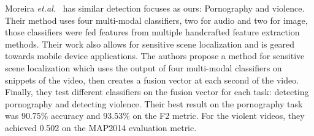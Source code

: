 Moreira \textit{et.al.}~\cite{moreira2019multimodal} has similar detection focuses as ours: Pornography and violence. 
Their method uses four multi-modal classifiers, two for audio and two for image, those classifiers were fed features from multiple handcrafted feature extraction methods. Their work also allows for sensitive scene localization and is geared towards mobile device applications.
The authors propose a method for sensitive scene localization which uses the output of four multi-modal classifiers on snippets of the video, then creates a fusion vector at each second of the video. 
Finally, they test different classifiers on the fusion vector for each task: detecting pornography and detecting violence. Their best result on the pornography task was 90.75\% accuracy and 93.53\% on the F2 metric. For the violent videos, they achieved 0.502 on the MAP2014 evaluation metric.



